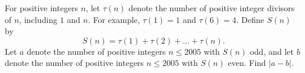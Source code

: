 For positive integers $n$, let $\tau (n)$ denote the number of positive integer divisors of $n$, including $1$ and $n$. For example, $\tau (1)=1$ and $\tau(6) =4$. Define $S(n)$ by \[S(n)=\tau(1)+ \tau(2) + ... + \tau(n).\]Let $a$ denote the number of positive integers $n \leq 2005$ with $S(n)$ odd, and let $b$ denote the number of positive integers $n \leq 2005$ with $S(n)$ even. Find $|a-b|$.